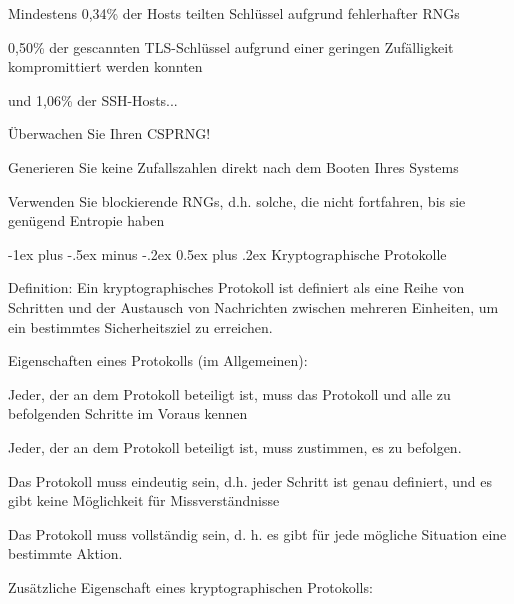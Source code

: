 \documentclass[a4paper]{article}
\makeatletter
\renewcommand{\section}{\@startsection{section}{1}{0mm}%
 {-1ex plus -.5ex minus -.2ex}%
 {0.5ex plus .2ex}%
 {\normalfont\large\bfseries}}
\makeatother
\begin{document}
\begin{multicols}{3}
\begin{itemize*}
            \begin{itemize*}
                  \item Mindestens 0,34\% der Hosts teilten Schlüssel aufgrund fehlerhafter RNGs
                  \item 0,50\% der gescannten TLS-Schlüssel aufgrund einer geringen Zufälligkeit kompromittiert werden konnten
                  \item und 1,06\% der SSH-Hosts...
            \end{itemize*}
            \item
            Überwachen Sie Ihren CSPRNG!

            \begin{itemize*}
                  \item Generieren Sie keine Zufallszahlen direkt nach dem Booten Ihres Systems
                  \item Verwenden Sie blockierende RNGs, d.h. solche, die nicht fortfahren, bis sie genügend Entropie haben
            \end{itemize*}
      \end{itemize*}


      \section{Kryptographische
        Protokolle}

      \begin{itemize*}
            \item
            Definition: Ein kryptographisches Protokoll ist definiert als eine
            Reihe von Schritten und der Austausch von Nachrichten zwischen
            mehreren Einheiten, um ein bestimmtes Sicherheitsziel zu erreichen.
            \item
            Eigenschaften eines Protokolls (im Allgemeinen):

            \begin{itemize*}
                  \item Jeder, der an dem Protokoll beteiligt ist, muss das Protokoll und alle zu befolgenden Schritte im Voraus kennen
                  \item Jeder, der an dem Protokoll beteiligt ist, muss zustimmen, es zu befolgen.
                  \item Das Protokoll muss eindeutig sein, d.h. jeder Schritt ist genau definiert, und es gibt keine Möglichkeit für Missverständnisse
                  \item Das Protokoll muss vollständig sein, d. h. es gibt für jede mögliche Situation eine bestimmte Aktion.
            \end{itemize*}
            \item
            Zusätzliche Eigenschaft eines kryptographischen Protokolls:


\end{itemize*}
\end{multicols}
\end{document}
